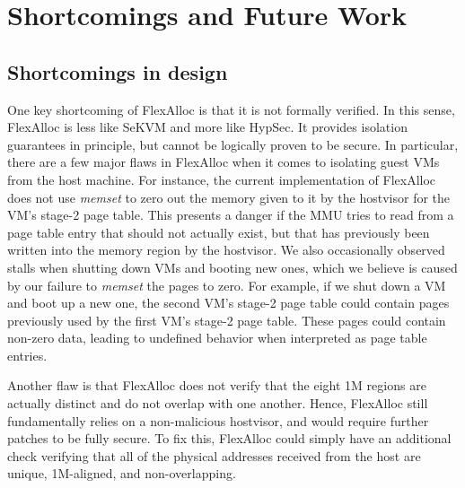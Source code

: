 \section{Shortcomings and Future Work}

\subsection{Shortcomings in design}

One key shortcoming of FlexAlloc is that it is not formally verified. In
this sense, FlexAlloc is less like SeKVM and more like HypSec. It provides isolation guarantees
in principle, but cannot be logically proven to be secure. In particular, there
are a few major flaws in FlexAlloc when it comes to isolating guest VMs from
the host machine. For instance, the current implementation of FlexAlloc
does not use \textit{memset} to zero out the memory given to it by the hostvisor
for the VM's stage-2 page table. This presents a danger if the MMU tries to
read from a page table entry that should not actually exist, but that has
previously been written into the memory region by the hostvisor. We also occasionally
observed stalls when shutting down VMs and booting new ones, which we
believe is caused by our failure to \textit{memset} the pages to zero. For example,
if we shut down a VM and boot up a new one, the second VM's stage-2 page table could contain pages previously
used by the first VM's stage-2 page table. These pages could contain non-zero data,
leading to undefined behavior when interpreted as page table entries.

Another flaw is that
FlexAlloc does not verify that the eight 1M regions are actually distinct and
do not overlap with one another. Hence, FlexAlloc still fundamentally relies on
a non-malicious hostvisor, and would require further patches to be fully secure.
To fix this, FlexAlloc could simply have an additional check verifying that all of the
physical addresses received from the host are unique, 1M-aligned, and non-overlapping.

